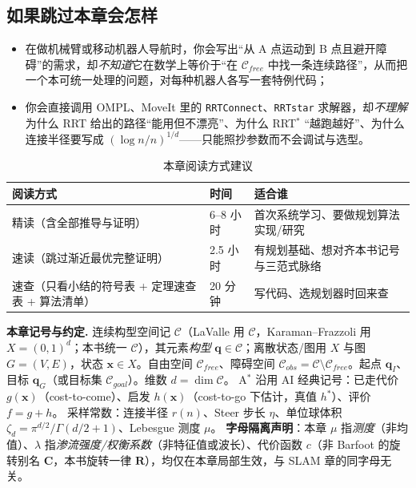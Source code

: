 \subsection*{如果跳过本章会怎样}
\begin{itemize}
  \item 在做机械臂或移动机器人导航时，你会写出“从 A 点运动到 B 点且避开障碍”的需求，却\emph{不知道}它在数学上等价于“在 $\mathcal{C}_{free}$ 中找一条连续路径”，从而把一个本可统一处理的问题，对每种机器人各写一套特例代码；
  \item 你会直接调用 OMPL、MoveIt 里的 \texttt{RRTConnect}、\texttt{RRTstar} 求解器，却\emph{不理解}为什么 RRT 给出的路径“能用但不漂亮”、为什么 RRT$^*$ “越跑越好”、为什么连接半径要写成 $(\log n/n)^{1/d}$——只能照抄参数而不会调试与选型。
\end{itemize}

\begin{table}[H]\centering\small
\caption{本章阅读方式建议}
\label{tab:plan-reading}
\begin{tabular}{lll}
\toprule
阅读方式 & 时间 & 适合谁 \\
\midrule
精读（含全部推导与证明） & 6--8 小时 & 首次系统学习、要做规划算法实现/研究 \\
速读（跳过渐近最优完整证明） & 2.5 小时 & 有规划基础、想对齐本书记号与三范式脉络 \\
速查（只看小结的符号表 + 定理速查表 + 算法清单） & 20 分钟 & 写代码、选规划器时回来查 \\
\bottomrule
\end{tabular}
\end{table}

\begin{note}
\textbf{本章记号与约定.}\;
连续构型空间记 $\mathcal{C}$（LaValle\cite{lavalle2006planning} 用 $\mathcal{C}$，Karaman--Frazzoli\cite{karaman2011sampling} 用 $X=(0,1)^d$；本书统一 $\mathcal{C}$），其元素\emph{构型} $\mathbf{q}\in\mathcal{C}$；离散状态/图用 $X$ 与图 $G=(V,E)$，状态 $\mathbf{x}\in X$。自由空间 $\mathcal{C}_{free}$、障碍空间 $\mathcal{C}_{obs}=\mathcal{C}\setminus\mathcal{C}_{free}$。起点 $\mathbf{q}_I$、目标 $\mathbf{q}_G$（或目标集 $\mathcal{C}_{goal}$）。维数 $d=\dim\mathcal{C}$。
A$^*$ 沿用 AI 经典记号：已走代价 $g(\mathbf{x})$（cost-to-come）、启发 $h(\mathbf{x})$（cost-to-go 下估计，真值 $h^*$）、评价 $f=g+h$。
采样常数：连接半径 $r(n)$、Steer 步长 $\eta$、单位球体积 $\zeta_d=\pi^{d/2}/\Gamma(d/2+1)$、Lebesgue 测度 $\mu$。
\textbf{字母隔离声明}：本章 $\mu$ 指\emph{测度}（非均值）、$\lambda$ 指\emph{渗流强度/权衡系数}（非特征值或波长）、代价函数 $c$（非 Barfoot 的旋转别名 $\mathbf{C}$，本书旋转一律 $\mathbf{R}$），均仅在本章局部生效，与 SLAM 章的同字母无关。
\end{note}

